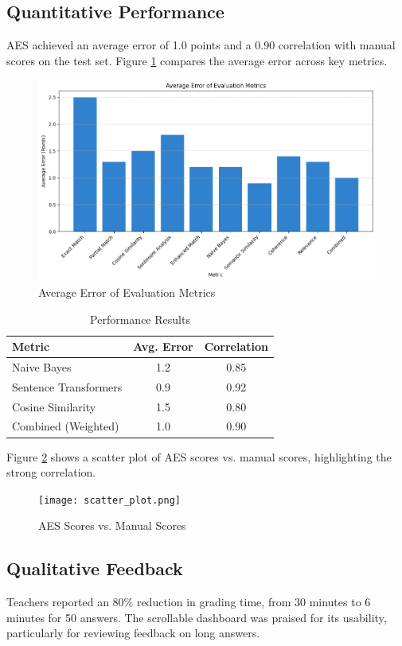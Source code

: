 \documentclass[conference]{IEEEtran}
\begin{document}
\subsection{Quantitative Performance}
AES achieved an average error of 1.0 points and a 0.90 correlation with manual scores on the test set. Figure \ref{fig:error} compares the average error across key metrics.

\begin{figure}[h]
    \centering
    \includegraphics[width=0.8\columnwidth]{error_plot.png}
    \caption{Average Error of Evaluation Metrics}
    \label{fig:error}
\end{figure}

\begin{table}[h]
    \centering
    \caption{Performance Results}
    \label{tab:results}
    \begin{tabular}{lcc}
        \toprule
        Metric & Avg. Error & Correlation \\
        \midrule
        Naive Bayes & 1.2 & 0.85 \\
        Sentence Transformers & 0.9 & 0.92 \\
        Cosine Similarity & 1.5 & 0.80 \\
        Combined (Weighted) & 1.0 & 0.90 \\
        \bottomrule
    \end{tabular}
\end{table}

Figure \ref{fig:scatter} shows a scatter plot of AES scores vs. manual scores, highlighting the strong correlation.

\begin{figure}[h]
    \centering
    \texttt{[image: scatter\_plot.png]}
    \caption{AES Scores vs. Manual Scores}
    \label{fig:scatter}
\end{figure}

\subsection{Qualitative Feedback}
Teachers reported an 80\% reduction in grading time, from 30 minutes to 6 minutes for 50 answers. The scrollable dashboard was praised for its usability, particularly for reviewing feedback on long answers.
\end{document}
